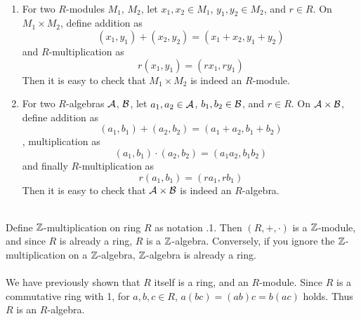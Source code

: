 \\
\begin{enumerate}
	\item For two $R$-modules $M_1$, $M_2$, let $x_1, x_2\in M_1$, $y_1, y_2\in M_2$, and $r\in R$. On $M_1\times M_2$, define addition as
	$$(x_1, y_1) + (x_2, y_2) = (x_1+x_2, y_1+y_2)$$
	and $R$-multiplication as
	$$r(x_1, y_1) = (rx_1, ry_1)$$
	Then it is easy to check that $M_1\times M_2$ is indeed an $R$-module.
	\item For two $R$-algebras $\mathcal{A}$, $\mathcal{B}$, let $a_1, a_2\in \mathcal{A}$, $b_1, b_2\in \mathcal{B}$, and $r\in R$. On $\mathcal{A}\times \mathcal{B}$, define addition as
	$$(a_1, b_1) + (a_2, b_2) = (a_1+a_2, b_1+b_2)$$
	, multiplication as
	$$(a_1, b_1)\cdot(a_2, b_2) = (a_1a_2, b_1b_2)$$
	and finally $R$-multiplication as
	$$r(a_1, b_1) = (ra_1, rb_1)$$
	Then it is easy to check that $\mathcal{A}\times\mathcal{B}$ is indeed an $R$-algebra.
\end{enumerate}~
\\
 Define $\mathbb{Z}$-multiplication on ring $R$ as notation {.1}. Then $(R, +, \cdot)$ is a $\mathbb{Z}$-module, and since $R$ is already a ring, $R$ is a $\mathbb{Z}$-algebra. Conversely, if you ignore the $\mathbb{Z}$-multiplication on a $\mathbb{Z}$-algebra, $\mathbb{Z}$-algebra is already a ring.\\
\\
 We have previously shown that $R$ itself is a ring, and an $R$-module. Since $R$ is a commutative ring with 1, for $a, b, c\in R$, $a(bc) = (ab)c = b(ac)$ holds. Thus $R$ is an $R$-algebra.\\
\\
